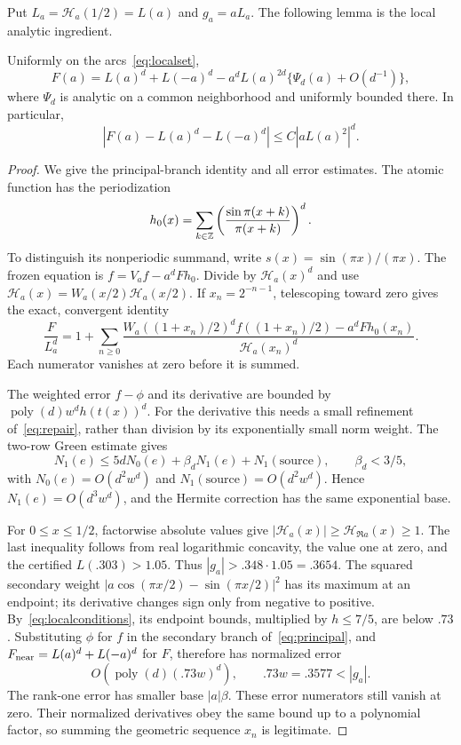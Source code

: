\documentclass[11pt,a4paper]{article}
\theoremstyle{remark}\newtheorem*{ednote}{Editorial note (ProveIt, 2026-10-01)}
\newcommand{\HH}{\mathcal H}\newcommand{\GG}{\mathcal G}
\begin{document}
Put $L_a=\HH_a(1/2)=L(a)$ and $g_a=aL_a$. The following lemma is the local analytic ingredient.
\begin{lemma}\label{lem:localfrozen}
Uniformly on the arcs~\eqref{eq:localset},
\begin{equation}\label{eq:localfrozen}
 F(a)=L(a)^d+L(-a)^d
       -a^dL(a)^{2d}\{\Psi_d(a)+O(d^{-1})\},
\end{equation}
where $\Psi_d$ is analytic on a common neighborhood and uniformly bounded there. In particular,
\[
 |F(a)-L(a)^d-L(-a)^d|\le C|aL(a)^2|^d.
\]
\end{lemma}
\begin{proof}
We give the principal-branch identity and all error estimates. The atomic function has the periodization
\[
 h_0(x)=\sum_{k\in\mathbb Z}\left(\frac{\sin\pi(x+k)}{\pi(x+k)}\right)^d.
\]
To distinguish its nonperiodic summand, write $s(x)=\sin(\pi x)/(\pi x)$. The frozen equation is
$f=V_af-a^dFh_0$. Divide by $\HH_a(x)^d$ and use
$\HH_a(x)=W_a(x/2)\HH_a(x/2)$. If $x_n=2^{-n-1}$, telescoping toward zero gives the exact, convergent identity
\begin{equation}\label{eq:principal}
 \frac{F}{L_a^d}=1+\sum_{n\ge0}
 \frac{W_a((1+x_n)/2)^d f((1+x_n)/2)-a^dFh_0(x_n)}{\HH_a(x_n)^d}.
\end{equation}
Each numerator vanishes at zero before it is summed.

The weighted error $f-\phi$ and its derivative are bounded by
$\operatorname{poly}(d)w^d h(t(x))^d$. For the derivative this needs a small refinement of~\eqref{eq:repair}, rather than division by its exponentially small norm weight. The two-row Green estimate gives
\[
 N_1(e)\le5dN_0(e)+\beta_dN_1(e)+N_1(\text{source}),
 \qquad \beta_d<3/5,
\]
with $N_0(e)=O(d^2w^d)$ and $N_1(\text{source})=O(d^2w^d)$. Hence $N_1(e)=O(d^3w^d)$, and the Hermite correction has the same exponential base.

For $0\le x\le1/2$, factorwise absolute values give
$|\HH_a(x)|\ge\HH_{\Re a}(x)\ge1$. The last inequality follows from real logarithmic concavity, the value one at zero, and the certified $L(.303)>1.05$. Thus $|g_a|>.348\cdot1.05=.3654$. The squared secondary weight
$|a\cos(\pi x/2)-\sin(\pi x/2)|^2$ has its maximum at an endpoint; its derivative changes sign only from negative to positive. By~\eqref{eq:localconditions}, its endpoint bounds, multiplied by $h\le7/5$, are below $.73$. Substituting $\phi$ for $f$ in the secondary branch of~\eqref{eq:principal}, and $F_{\rm near}=L(a)^d+L(-a)^d$ for $F$, therefore has normalized error
\[
 O(\operatorname{poly}(d)(.73w)^d),\qquad .73w=.3577<|g_a|.
\]
The rank-one error has smaller base $|a|\beta$. These error numerators still vanish at zero. Their normalized derivatives obey the same bound up to a polynomial factor, so summing the geometric sequence $x_n$ is legitimate.


\end{proof}
\end{document}
